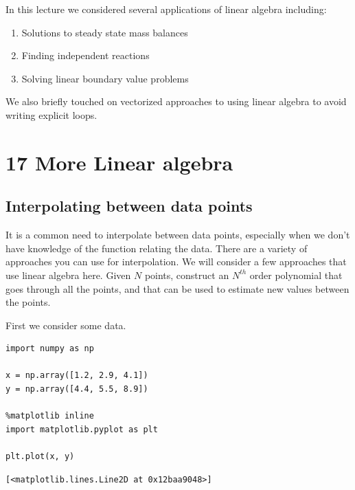 \documentclass[11pt]{article}
\begin{document}
In this lecture we considered several applications of linear algebra including:
\begin{enumerate}
\item Solutions to steady state mass balances
\item Finding independent reactions
\item Solving linear boundary value problems
\end{enumerate}

We also briefly touched on vectorized approaches to using linear algebra to avoid writing explicit loops.

\section{17 More Linear algebra}
\label{sec:org7aedf1c}

\subsection{Interpolating between data points}
\label{sec:org071b7a6}

It is a common need to interpolate between data points, especially when we don't have knowledge of the function relating the data. There are a variety of approaches you can use for interpolation. We will consider a few approaches that use linear algebra here. Given \(N\) points, construct an \(N^{th}\) order polynomial that goes through all the points, and that can be used to estimate new values between the points.

First we consider some data.

\begin{verbatim}
import numpy as np

x = np.array([1.2, 2.9, 4.1])
y = np.array([4.4, 5.5, 8.9])

%matplotlib inline
import matplotlib.pyplot as plt

plt.plot(x, y)
\end{verbatim}

\begin{verbatim}
[<matplotlib.lines.Line2D at 0x12baa9048>]
\end{verbatim}
\end{document}
